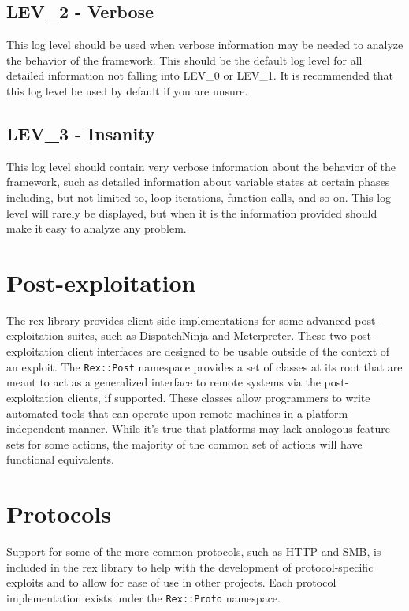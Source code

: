 \documentclass{report}
\begin{document}
        \subsection{LEV\_2 - Verbose}

This log level should be used when verbose information may be needed
to analyze the behavior of the framework.  This should be the
default log level for all detailed information not falling into
LEV\_0 or LEV\_1. It is recommended that this log level be used by
default if you are unsure.

        \subsection{LEV\_3 - Insanity}

This log level should contain very verbose information about the
behavior of the framework, such as detailed information about variable
states at certain phases including, but not limited to, loop iterations,
function calls, and so on.  This log level will rarely be displayed,
but when it is the information provided should make it easy to analyze
any problem.

    \section{Post-exploitation}

\par
The rex library provides client-side implementations for some
advanced post-exploitation suites, such as DispatchNinja and
Meterpreter. These two post-exploitation client interfaces are
designed to be usable outside of the context of an exploit.  The
\texttt{Rex::Post} namespace provides a set of classes at its root
that are meant to act as a generalized interface to remote systems
via the post-exploitation clients, if supported.  These classes
allow programmers to write automated tools that can operate upon
remote machines in a platform-independent manner.  While it's true
that platforms may lack analogous feature sets for some actions, the
majority of the common set of actions will have functional
equivalents.

    \section{Protocols}

\par
Support for some of the more common protocols, such as HTTP and SMB,
is included in the rex library to help with the development of
protocol-specific exploits and to allow for ease of use in other
projects.  Each protocol implementation exists under the
\texttt{Rex::Proto} namespace.
\end{document}
